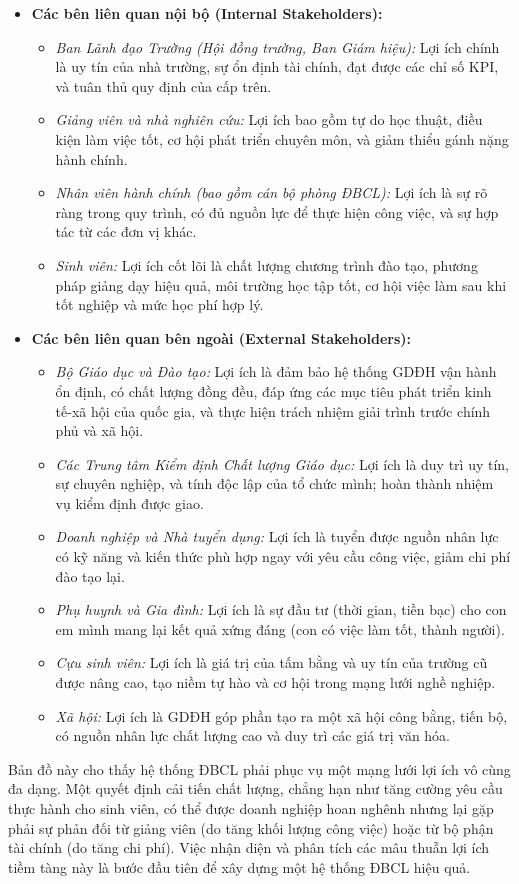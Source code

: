 \documentclass[12pt, a4paper, openany]{report}
\begin{document}
\begin{itemize}
    \item \textbf{Các bên liên quan nội bộ (Internal Stakeholders):}
        \begin{itemize}
            \item \textit{Ban Lãnh đạo Trường (Hội đồng trường, Ban Giám hiệu):} Lợi ích chính là uy tín của nhà trường, sự ổn định tài chính, đạt được các chỉ số KPI, và tuân thủ quy định của cấp trên.
            \item \textit{Giảng viên và nhà nghiên cứu:} Lợi ích bao gồm tự do học thuật, điều kiện làm việc tốt, cơ hội phát triển chuyên môn, và giảm thiểu gánh nặng hành chính.
            \item \textit{Nhân viên hành chính (bao gồm cán bộ phòng ĐBCL):} Lợi ích là sự rõ ràng trong quy trình, có đủ nguồn lực để thực hiện công việc, và sự hợp tác từ các đơn vị khác.
            \item \textit{Sinh viên:} Lợi ích cốt lõi là chất lượng chương trình đào tạo, phương pháp giảng dạy hiệu quả, môi trường học tập tốt, cơ hội việc làm sau khi tốt nghiệp và mức học phí hợp lý.
        \end{itemize}
    \item \textbf{Các bên liên quan bên ngoài (External Stakeholders):}
        \begin{itemize}
            \item \textit{Bộ Giáo dục và Đào tạo:} Lợi ích là đảm bảo hệ thống GDĐH vận hành ổn định, có chất lượng đồng đều, đáp ứng các mục tiêu phát triển kinh tế-xã hội của quốc gia, và thực hiện trách nhiệm giải trình trước chính phủ và xã hội.
            \item \textit{Các Trung tâm Kiểm định Chất lượng Giáo dục:} Lợi ích là duy trì uy tín, sự chuyên nghiệp, và tính độc lập của tổ chức mình; hoàn thành nhiệm vụ kiểm định được giao.
            \item \textit{Doanh nghiệp và Nhà tuyển dụng:} Lợi ích là tuyển được nguồn nhân lực có kỹ năng và kiến thức phù hợp ngay với yêu cầu công việc, giảm chi phí đào tạo lại.
            \item \textit{Phụ huynh và Gia đình:} Lợi ích là sự đầu tư (thời gian, tiền bạc) cho con em mình mang lại kết quả xứng đáng (con có việc làm tốt, thành người).
            \item \textit{Cựu sinh viên:} Lợi ích là giá trị của tấm bằng và uy tín của trường cũ được nâng cao, tạo niềm tự hào và cơ hội trong mạng lưới nghề nghiệp.
            \item \textit{Xã hội:} Lợi ích là GDĐH góp phần tạo ra một xã hội công bằng, tiến bộ, có nguồn nhân lực chất lượng cao và duy trì các giá trị văn hóa.
        \end{itemize}
\end{itemize}
Bản đồ này cho thấy hệ thống ĐBCL phải phục vụ một mạng lưới lợi ích vô cùng đa dạng. Một quyết định cải tiến chất lượng, chẳng hạn như tăng cường yêu cầu thực hành cho sinh viên, có thể được doanh nghiệp hoan nghênh nhưng lại gặp phải sự phản đối từ giảng viên (do tăng khối lượng công việc) hoặc từ bộ phận tài chính (do tăng chi phí). Việc nhận diện và phân tích các mâu thuẫn lợi ích tiềm tàng này là bước đầu tiên để xây dựng một hệ thống ĐBCL hiệu quả.
\end{document}
